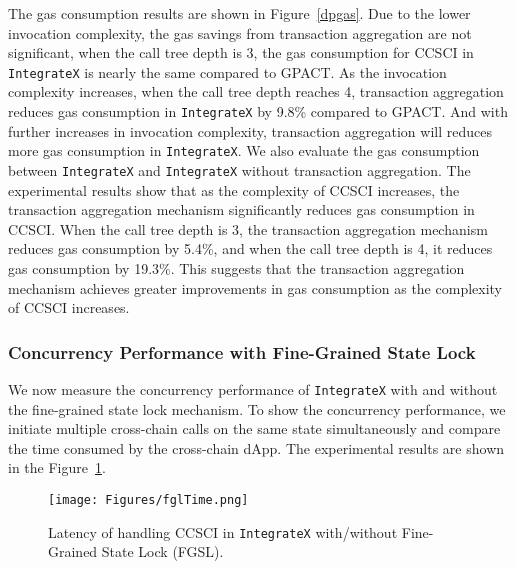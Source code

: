 The gas consumption results are shown in Figure~\ref{dpgas}. 
Due to the lower invocation complexity, the gas savings from transaction aggregation are not significant,
when the call tree depth is 3, the gas consumption for CCSCI in \texttt{IntegrateX} is nearly the same compared to GPACT. As the invocation complexity increases, when the call tree depth reaches 4, transaction aggregation reduces gas consumption in \texttt{IntegrateX} by 9.8\% compared to GPACT. And with further increases in invocation complexity, transaction aggregation will reduces more gas consumption in \texttt{IntegrateX}. We also evaluate the gas consumption between \texttt{IntegrateX} and \texttt{IntegrateX} without transaction aggregation. The experimental results show that as the complexity of CCSCI increases, the transaction aggregation mechanism significantly reduces gas consumption in CCSCI. When the call tree depth is 3, the transaction aggregation mechanism reduces gas consumption by 5.4\%, and when the call tree depth is 4, it reduces gas consumption by 19.3\%. This suggests that the transaction aggregation mechanism achieves greater improvements in gas consumption as the complexity of CCSCI increases.


\subsubsection{Concurrency Performance with Fine-Grained State Lock}
We now measure the concurrency performance of \texttt{IntegrateX} with and without the fine-grained state lock mechanism. 
To show the concurrency performance, we initiate multiple cross-chain calls on the same state simultaneously and compare the time consumed by the cross-chain dApp. 
The experimental results are shown in the Figure~\ref{fgl_t}.

\begin{figure}[t]
    \centering
    \texttt{[image: Figures/fglTime.png]}

    \caption{Latency of handling CCSCI in \texttt{IntegrateX} with/without Fine-Grained State Lock (FGSL).}
    \label{fgl_t}
\end{figure} 

